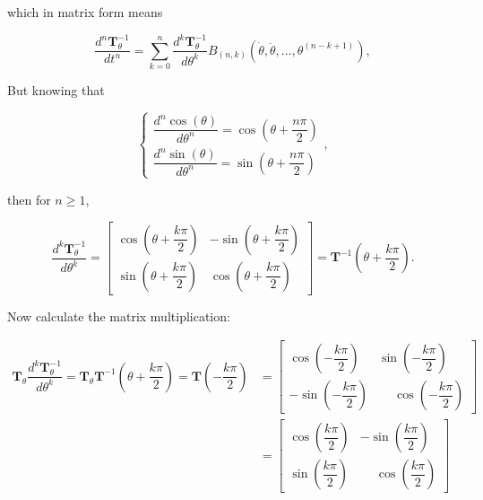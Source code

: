 	\noindent which in matrix form means

\begin{equation} \dfrac{d^n\mathbf{T}^{-1}_\theta}{dt^n} = \sum\limits_{k=0}^n \dfrac{d^k\mathbf{T}^{-1}_\theta}{d\theta^k} B_{\left(n,k\right)}\left(\dot{\theta},\ddot{\theta},...,\theta^{(n-k+1)}\right), \end{equation}

	But knowing that

\begin{equation}
	\left\{\begin{array}{l}
		\dfrac{d^n \cos\left(\theta\right)}{d\theta^n} = \cos\left(\theta + \dfrac{n\pi}{2}\right) \\[5mm]
		\dfrac{d^n \sin\left(\theta\right)}{d\theta^n} = \sin\left(\theta + \dfrac{n\pi}{2}\right)
	\end{array}\right. ,
\end{equation}

	\noindent then for $n\geq 1$,

\begin{equation} \dfrac{d^k \mathbf{T}^{-1}_\theta}{d\theta^k} =  \left[\begin{array}{cc} \cos\left(\theta + \dfrac{k\pi}{2}\right) & -\sin\left(\theta + \dfrac{k\pi}{2}\right) \\[5mm] \sin\left(\theta + \dfrac{k\pi}{2}\right) & \cos\left(\theta + \dfrac{k\pi}{2}\right)\end{array}\right] = \mathbf{T}^{-1}\left(\theta + \dfrac{k\pi}{2}\right).\end{equation}

	Now calculate the matrix multiplication:

\begin{align}
\mathbf{T}_\theta \dfrac{d^k\mathbf{T}_\theta^{-1}}{d\theta^k} = \mathbf{T}_\theta\mathbf{T}^{-1}\left(\theta + \dfrac{k\pi}{2}\right) = \mathbf{T}\left(-\dfrac{k\pi}{2}\right) &= \left[\begin{array}{cc} \cos\left(-\dfrac{k\pi}{2}\right) & \sin\left(-\dfrac{k\pi}{2}\right) \\[5mm] -\sin\left(-\dfrac{k\pi}{2}\right) & \phantom{-}\cos\left(- \dfrac{k\pi}{2}\right)\end{array}\right] \nonumber\\[5mm] &= \left[\begin{array}{cc} \cos\left(\dfrac{k\pi}{2}\right) & -\sin\left(\dfrac{k\pi}{2}\right) \\[5mm] \sin\left(\dfrac{k\pi}{2}\right) & \phantom{-}\cos\left(\dfrac{k\pi}{2}\right)\end{array}\right]
\end{align}

